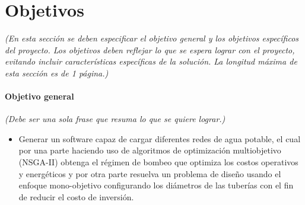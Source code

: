 \documentclass[11pt,letterpaper]{article}
\begin{document}

\section{Objetivos}
\emph{(En esta sección se deben especificar el objetivo general y los objetivos específicos del proyecto. Los objetivos deben reflejar lo que se espera lograr con el proyecto, evitando incluir características específicas de la solución. La longitud máxima de esta sección es de 1 página.)}

\paragraph{Objetivo general}
\emph{(Debe ser una sola frase que resuma lo que se quiere lograr.)} 
\begin{itemize}
\item Generar un software capaz de cargar diferentes redes de agua potable, el cual por una parte haciendo uso de algoritmos de optimización multiobjetivo (NSGA-II) obtenga el régimen de bombeo que optimiza los costos operativos y energéticos y por otra parte resuelva un problema de diseño usando el enfoque mono-objetivo configurando los diámetros de las tuberías con el fin de reducir el costo de inversión.
\end{itemize}
\end{document}
